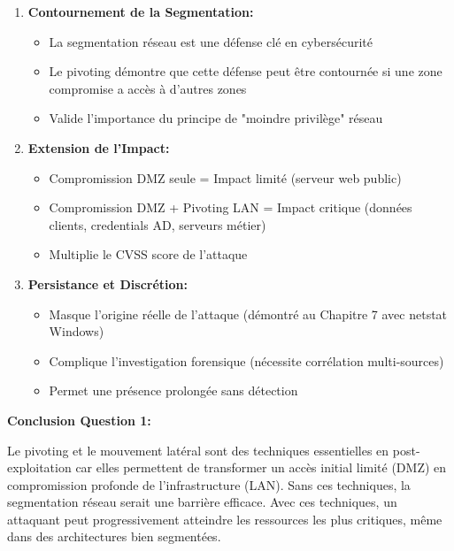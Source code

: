 \documentclass[12pt,a4paper,openany]{report}
\begin{document}
	\begin{enumerate}
		\item \textbf{Contournement de la Segmentation:}
		\begin{itemize}
			\item La segmentation réseau est une défense clé en cybersécurité
			\item Le pivoting démontre que cette défense peut être contournée 
			si une zone compromise a accès à d'autres zones
			\item Valide l'importance du principe de "moindre privilège" réseau
		\end{itemize}
		
		\item \textbf{Extension de l'Impact:}
		\begin{itemize}
			\item Compromission DMZ seule = Impact limité (serveur web public)
			\item Compromission DMZ + Pivoting LAN = Impact critique (données clients, 
			credentials AD, serveurs métier)
			\item Multiplie le CVSS score de l'attaque
		\end{itemize}
		
		\item \textbf{Persistance et Discrétion:}
		\begin{itemize}
			\item Masque l'origine réelle de l'attaque (démontré au Chapitre 7 
			avec netstat Windows)
			\item Complique l'investigation forensique (nécessite corrélation 
			multi-sources)
			\item Permet une présence prolongée sans détection
		\end{itemize}
	\end{enumerate}
	
	\textbf{Conclusion Question 1:}
	
	Le pivoting et le mouvement latéral sont des techniques essentielles en 
	post-exploitation car elles permettent de transformer un accès initial 
	limité (DMZ) en compromission profonde de l'infrastructure (LAN). Sans 
	ces techniques, la segmentation réseau serait une barrière efficace. 
	Avec ces techniques, un attaquant peut progressivement atteindre les 
	ressources les plus critiques, même dans des architectures bien segmentées.
	
	
\end{document}
